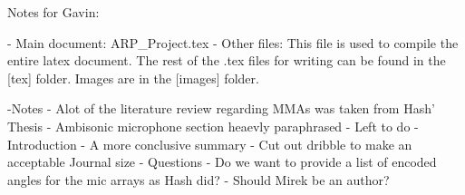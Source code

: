 Notes for Gavin:






- Main document:
	ARP_Project.tex
- Other files:
	This file is used to compile the entire latex document. The rest of the .tex files for writing can be found in the [tex] folder. Images are in the [images] folder.



	 -Notes
	 	- Alot of the literature review regarding MMAs was taken from Hash' Thesis
	 	- Ambisonic microphone section heaevly paraphrased
	 - Left to do
	 	- Introduction
	 	- A more conclusive summary
	 	- Cut out dribble to make an acceptable Journal size
	 - Questions
		 - Do we want to provide a list of encoded angles for the mic arrays as Hash did?
		 - Should Mirek be an author?



